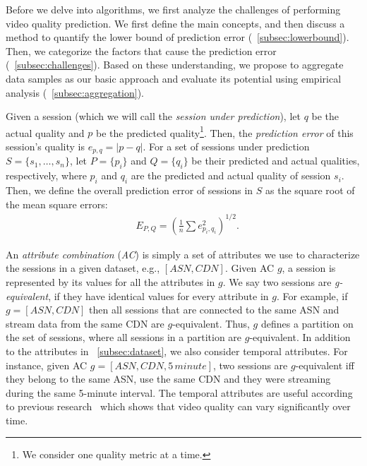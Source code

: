 \label{sec:challenges}

Before we delve into algorithms, we first analyze the challenges of
performing video quality prediction. We first define the main
concepts, and then discuss a method to quantify the lower bound of
prediction error (\Section~\ref{subsec:lowerbound}). Then, we
categorize the factors that cause the prediction error
(\Section~\ref{subsec:challenges}). Based on these understanding, we
propose to aggregate data samples as our basic approach and evaluate
its potential using empirical analysis
(\Section~\ref{subsec:aggregation}).

\label{subsec:lowerbound}

Given a session (which we will call the {\it session under
  prediction}), let $q$ be the actual quality and $p$ be the predicted
quality\footnote{We consider one quality metric at a time.}. Then, the
{\it prediction error} of this session's quality is $e_{p,q}=|p-q|$.
For a set of sessions under prediction $S=\{s_1,\dots,s_n\}$, let
$P=\{p_i\}$ and $Q=\{q_i\}$ be their predicted and actual qualities,
respectively, where $p_i$ and $q_i$ are the predicted and actual
quality of session $s_i$. Then, we define the overall prediction error
of sessions in $S$ as the square root of the mean square errors:
\begin{align}
&E_{P,Q}=\left(\frac{1}{n}\sum e_{p_i,q_i}^2\right)^{1/2}.
\end{align}

 An {\it attribute
  combination} ({\it AC}) is simply a set of attributes we use to
characterize the sessions in a given dataset, e.g., $[ASN,
CDN]$. Given AC $g$, a session is represented by its values for all
the attributes in $g$. We say two sessions are {\it g-equivalent}, if
they have identical values for every attribute in $g$. For example, if
$g=[ASN,CDN]$ then all sessions that are connected to the same ASN and
stream data from the same CDN are $g$-equivalent. Thus, $g$ defines a
partition on the set of sessions, where all sessions in a partition
are $g$-equivalent. In addition to the attributes in
\Section~\ref{subsec:dataset}, we also consider temporal
attributes. For instance, given AC $g=[ASN, CDN, 5\,minute]$, two
sessions are $g$-equivalent iff they belong to the same ASN, use the
same CDN and they were streaming during the same 5-minute
interval. The temporal attributes are useful according to previous
research~\cite{sigcomm12} which shows that video quality can vary
significantly over time.

